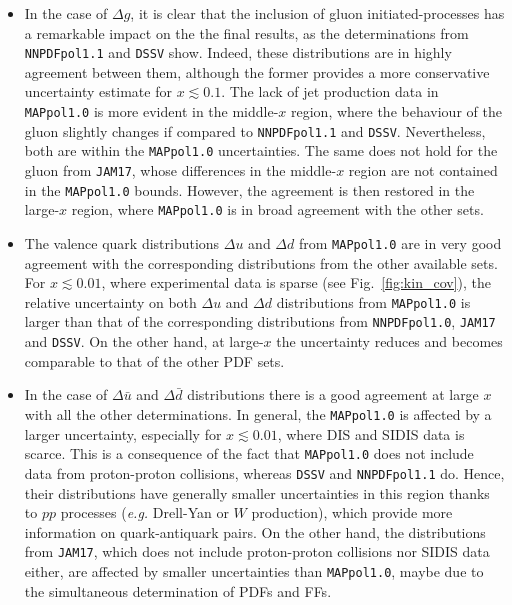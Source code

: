 \begin{itemize}
  \item In the case of $\Delta g$, it is clear that the inclusion of gluon initiated-processes has a remarkable impact on the the final results, as the determinations from \texttt{NNPDFpol1.1} and \texttt{DSSV} show. Indeed, these distributions are in highly agreement between them, although the former provides a more conservative uncertainty estimate for $x \lesssim 0.1$. The lack of jet production data in \texttt{MAPpol1.0} is more evident in the middle-$x$ region, where the behaviour of the gluon slightly changes if compared to \texttt{NNPDFpol1.1} and \texttt{DSSV}. Nevertheless, both are within the \texttt{MAPpol1.0} uncertainties. The same does not hold for the gluon from \texttt{JAM17}, whose differences in the middle-$x$ region are not contained in the \texttt{MAPpol1.0} bounds. However, the agreement is then restored in the large-$x$ region, where \texttt{MAPpol1.0} is in broad agreement with the other sets.
  \item The valence quark distributions $\Delta u$ and $\Delta d$ from \texttt{MAPpol1.0} are in very good agreement with the corresponding distributions from the other available sets. For $x \lesssim 0.01$, where experimental data is sparse (see Fig.~\ref{fig:kin_cov}), the relative uncertainty on both $\Delta u$ and $\Delta d$ distributions from \texttt{MAPpol1.0} is larger than that of the corresponding distributions from \texttt{NNPDFpol1.0}, \texttt{JAM17} and \texttt{DSSV}. On the other hand, at large-$x$ the uncertainty reduces and becomes comparable to that of the other PDF sets.
  \item In the case of $\Delta \bar{u}$ and $\Delta \bar{d}$ distributions there is a good agreement at large $x$ with all the other determinations. In general, the \texttt{MAPpol1.0} is affected by a larger uncertainty, especially for $x \lesssim 0.01$, where DIS and SIDIS data is scarce. This is a consequence of the fact that \texttt{MAPpol1.0} does not include data from proton-proton collisions, whereas \texttt{DSSV} and \texttt{NNPDFpol1.1} do. Hence, their distributions have generally smaller uncertainties in this region thanks to $pp$ processes (\textit{e.g.} Drell-Yan or $W$ production), which provide more information on quark-antiquark pairs. On the other hand, the distributions from \texttt{JAM17}, which does not include proton-proton collisions nor SIDIS data either, are affected by smaller uncertainties than \texttt{MAPpol1.0}, maybe due to the simultaneous determination of PDFs and FFs.

\end{itemize}
